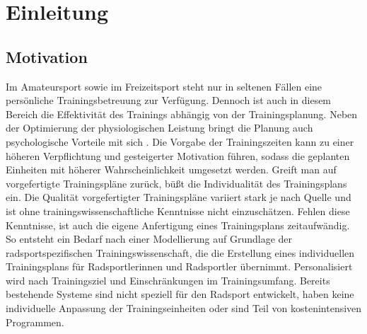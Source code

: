 \chapter{Einleitung}
\label{sec:einleitung}
\section{Motivation}
Im Amateursport sowie im Freizeitsport steht nur in seltenen Fällen eine persönliche Trainingsbetreuung zur Verfügung. Dennoch ist auch in diesem Bereich die Effektivität des Trainings abhängig von der Trainingsplanung. Neben der Optimierung der physiologischen Leistung bringt die Planung auch psychologische Vorteile mit sich \cite{ImplementationIntentions}. Die Vorgabe der Trainingszeiten kann zu einer höheren Verpflichtung und gesteigerter Motivation führen, sodass die geplanten Einheiten mit höherer Wahrscheinlichkeit umgesetzt werden.
Greift man auf vorgefertigte Trainingspläne zurück, büßt die Individualität des Trainingsplans ein.  Die Qualität vorgefertigter Trainingspläne variiert stark je nach Quelle und ist ohne trainingswissenschaftliche Kenntnisse nicht einzuschätzen. Fehlen diese Kenntnisse, ist auch die eigene Anfertigung eines Trainingsplans zeitaufwändig. 
So entsteht ein Bedarf nach einer Modellierung auf Grundlage der radsportspezifischen Trainingswissenschaft, die die Erstellung eines individuellen Trainingsplans für Radsportlerinnen und Radsportler übernimmt. Personalisiert wird nach Trainingsziel und Einschränkungen im Trainingsumfang. 
Bereits bestehende Systeme sind nicht speziell für den Radsport entwickelt, haben keine individuelle Anpassung der Trainingseinheiten oder sind Teil von kostenintensiven Programmen.

